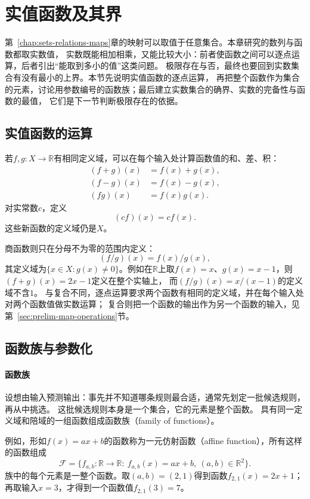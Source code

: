 \section{实值函数及其界}
\label{sec:real-valued-functions-bounds}

第~\ref{chap:sets-relations-maps}章的映射可以取值于任意集合。本章研究的数列与函数都取实数值，
实数既能相加相乘，又能比较大小：前者使函数之间可以逐点运算，后者引出“能取到多小的值”这类问题。
极限存在与否，最终也要回到实数集合有没有最小的上界。本节先说明实值函数的逐点运算，
再把整个函数作为集合的元素，讨论用参数编号的函数族；最后建立实数集合的确界、实数的完备性与函数的最值，
它们是下一节判断极限存在的依据。

\subsection{实值函数的运算}
\label{sec:real-function-arithmetic}

若$f,g:X\to\mathbb R$有相同定义域，可以在每个输入处计算函数值的和、差、积：
\[
 \begin{aligned}
 (f+g)(x)&=f(x)+g(x),\\
 (f-g)(x)&=f(x)-g(x),\\
 (fg)(x)&=f(x)g(x).
 \end{aligned}
\]
对实常数$c$，定义
\[
  (cf)(x)=cf(x).
\]
这些新函数的定义域仍是$X$。

商函数则只在分母不为零的范围内定义：
\[
  (f/g)(x)=f(x)/g(x),
\]
其定义域为$\{x\in X:g(x)\neq0\}$。例如在$\mathbb R$上取$f(x)=x$、$g(x)=x-1$，则$(f+g)(x)=2x-1$定义在整个实轴上，
而$(f/g)(x)=x/(x-1)$的定义域不含$1$。
与复合不同，逐点运算要求两个函数有相同的定义域，并在每个输入处对两个函数值做实数运算；
复合则把一个函数的输出作为另一个函数的输入，见第~\ref{sec:prelim-map-operations}节。

\subsection{函数族与参数化}
\label{sec:prelim-function-families}

\paragraph{函数族}
设想由输入预测输出：事先并不知道哪条规则最合适，通常先划定一批候选规则，再从中挑选。
这批候选规则本身是一个集合，它的元素是整个函数。
具有同一定义域和陪域的一组函数组成函数族（family of functions）。

例如，形如$f(x)=ax+b$的函数称为一元仿射函数（affine function），所有这样的函数组成
\[
 \mathcal F=\{f_{a,b}:\mathbb R\to\mathbb R:\ f_{a,b}(x)=ax+b,\ (a,b)\in\mathbb R^2\}.
\]
族中的每个元素是一整个函数。取$(a,b)=(2,1)$得到函数$f_{2,1}(x)=2x+1$；
再取输入$x=3$，才得到一个函数值$f_{2,1}(3)=7$。

